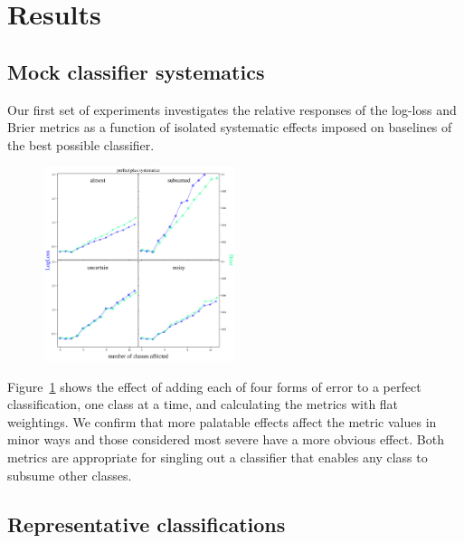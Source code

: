 \section{Results}
\label{sec:results}

\subsection{Mock classifier systematics}
\label{sec:mockresults}

Our first set of experiments investigates the relative responses of the log-loss and Brier metrics as a function of isolated systematic effects imposed on baselines of the best possible classifier.

\begin{figure}
	\begin{center}
		\includegraphics[width=0.5\textwidth]{./fig/systematics_onlyperfect.png}
		\caption{}
		\label{fig:subsume}
	\end{center}
\end{figure}

Figure~\ref{fig:subsume} shows the effect of adding each of four forms of error to a perfect classification, one class at a time, and calculating the metrics with flat weightings.
We confirm that more palatable effects affect the metric values in minor ways and those considered most severe have a more obvious effect.
Both metrics are appropriate for singling out a classifier that enables any class to subsume other classes.



\subsection{Representative classifications}
\label{sec:realresults}


